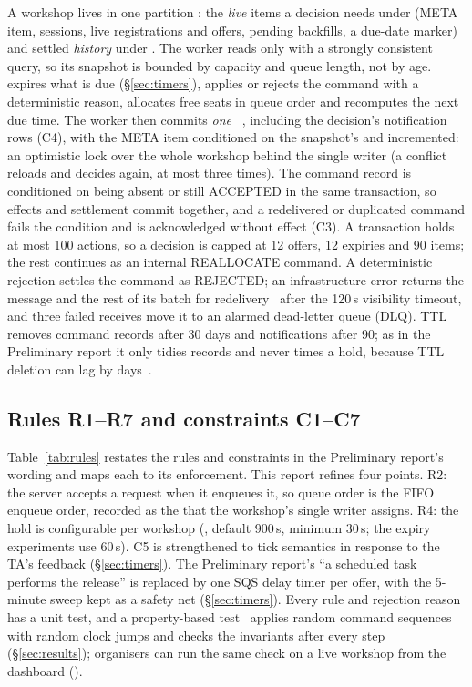 A workshop lives in one partition : the \emph{live} items a decision needs under
 (META item, sessions, live registrations and offers, pending backfills, a due-date marker)
and settled \emph{history} under . The worker reads only  with a strongly
consistent query, so its snapshot is bounded by capacity and queue length, not by age.
 expires what is due (\S\ref{sec:timers}), applies or rejects the command with a
deterministic reason, allocates free seats in queue order and recomputes the next due time. The
worker then commits \emph{one}
~\cite{aws-ddb-transactions,aws-ddb-transactwriteitems}, including the
decision's notification rows (C4), with the META item conditioned on the snapshot's 
and incremented: an optimistic lock over the whole workshop behind the single writer (a conflict
reloads and decides again, at most three times). The command record is conditioned on being absent
or still ACCEPTED in the same transaction, so effects and settlement commit together, and a
redelivered or duplicated command fails the condition and is acknowledged without effect (C3). A
transaction holds at most 100 actions, so a decision is capped at 12 offers, 12 expiries and 90
items; the rest continues as an internal REALLOCATE command. A deterministic rejection settles the
command as REJECTED; an infrastructure error returns the message and the rest of its batch for
redelivery~\cite{aws-lambda-sqs-errors} after the 120\,s visibility timeout, and three failed
receives move it to an alarmed dead-letter queue (DLQ). TTL removes command records after 30 days
and notifications after 90; as in the Preliminary report it only tidies records and never times a
hold, because TTL deletion can lag by days~\cite{aws-ddb-ttl}.

\subsection{Rules R1--R7 and constraints C1--C7}\label{sec:rules}
Table~\ref{tab:rules} restates the rules and constraints in the Preliminary report's wording and
maps each to its enforcement. This report refines four points. R2: the server accepts a request when
it enqueues it, so queue order is the FIFO enqueue order, recorded as the  that the
workshop's single writer assigns. R4: the hold is configurable per workshop (,
default 900\,s, minimum 30\,s; the expiry experiments use 60\,s). C5 is strengthened to tick
semantics in response to the TA's feedback (\S\ref{sec:timers}). The Preliminary report's
\enquote{a scheduled task performs the release} is replaced by one SQS delay timer per offer, with
the 5-minute sweep kept as a safety net (\S\ref{sec:timers}). Every rule and rejection reason has a
unit test, and a property-based test~\cite{claessen2000quickcheck,fastcheck} applies random command
sequences with random clock jumps and checks the invariants after every step (\S\ref{sec:results});
organisers can run the same check on a live workshop from the dashboard ().

